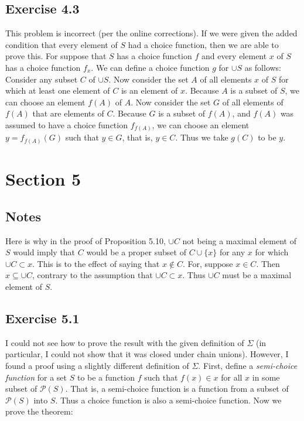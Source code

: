 \documentclass{article}
\theoremstyle{definition}
\begin{document}
\subsection*{Exercise 4.3}
This problem is incorrect (per the online corrections). If we were given the added condition that every element of $S$ had a choice function, then we are able to 
prove this. For suppose that $S$ has a choice function $f$ and every element $x$ of $S$ has a choice function $f_x$. We can 
define a choice function $g$ for $\cup S$ as follows: Consider any 
subset $C$ of $\cup S$. Now consider the set $A$ of all elements $x$ of $S$ for which at least one element of $C$ is an element of 
$x$. Because $A$ is a subset of $S$, we can choose an element $f(A)$ of $A$. Now consider the set $G$ of all elements of 
$f(A)$ that are elements of $C$. Because $G$ is a subset of $f(A)$, and $f(A)$ was assumed to have a choice function 
$f_{f(A)}$, we can choose an element $y=f_{f(A)}(G)$ such that $y\in G$, that is, $y\in C$. Thus we take 
$g(C)$ to be $y$. 

\section*{Section 5}

\subsection*{Notes}
Here is why in the proof of Proposition 5.10, $\cup C$ not being a maximal element of $S$ would imply that $C$ would be a proper subset of $C\cup\{x\}$ for 
any $x$ for which $\cup C\subset x$. This is to the effect of saying that $x\notin C$. For, suppose $x\in C$. Then $x\subseteq\cup C$, contrary 
to the assumption that $\cup C\subset x$. Thus $\cup C$ must be a maximal element of $S$.

\subsection*{Exercise 5.1}
I could not see how to prove the result with the given definition of $\Sigma$ (in particular, I could not show that it was closed under chain unions). However, 
I found a proof using a slightly different definition of $\Sigma$. First, define a \textit{semi-choice function} for a set $S$ to be a function 
$f$ such that $f(x)\in x$ for all $x$ in some subset of $\mathcal{P}(S)$. That is, a semi-choice function is a function from a subset of $\mathcal{P}(S)$ into 
$S$. Thus a choice function is also a semi-choice function. Now we prove 
the theorem:
\end{document}
